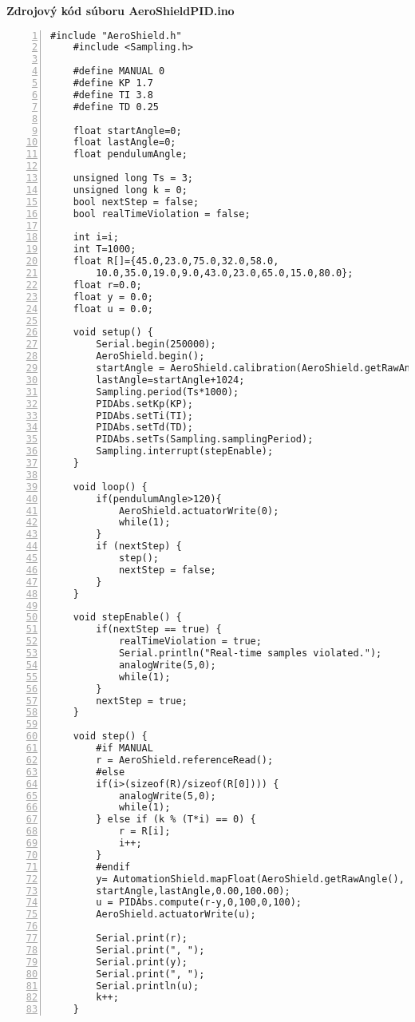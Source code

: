 \LARGE\bf{Zdrojový kód súboru AeroShieldPID.ino}
\label{AeroShieldPID.ino}
\vspace{1cm}
\begin{lstlisting}[numbers=left,basicstyle=\scriptsize,caption={Zdrojový kód súboru AeroShieldPID.ino.},captionpos=b]	
	#include "AeroShield.h"              
	#include <Sampling.h>   
	
	#define MANUAL 0    
	#define KP 1.7  
	#define TI 3.8  
	#define TD 0.25   
	
	float startAngle=0; 
	float lastAngle=0; 
	float pendulumAngle;
	
	unsigned long Ts = 3; 
	unsigned long k = 0; 
	bool nextStep = false;  
	bool realTimeViolation = false;
	
	int i=i;          
	int T=1000;           
	float R[]={45.0,23.0,75.0,32.0,58.0,
		10.0,35.0,19.0,9.0,43.0,23.0,65.0,15.0,80.0}; 
	float r=0.0;          
	float y = 0.0;        
	float u = 0.0;         
	
	void setup() {           
		Serial.begin(250000);                         
		AeroShield.begin();
		startAngle = AeroShield.calibration(AeroShield.getRawAngle()); 
		lastAngle=startAngle+1024;                                  
		Sampling.period(Ts*1000);      
		PIDAbs.setKp(KP);       
		PIDAbs.setTi(TI);    
		PIDAbs.setTd(TD);     
		PIDAbs.setTs(Sampling.samplingPeriod); 
		Sampling.interrupt(stepEnable); 
	}
	
	void loop() {
		if(pendulumAngle>120){
			AeroShield.actuatorWrite(0);
			while(1);
		} 
		if (nextStep) {    
			step();          
			nextStep = false;  
		}
	}
	
	void stepEnable() {             
		if(nextStep == true) {         
			realTimeViolation = true;   
			Serial.println("Real-time samples violated."); 
			analogWrite(5,0);  
			while(1);    
		}
		nextStep = true; 
	}
	
	void step() {  
		#if MANUAL                       
		r = AeroShield.referenceRead(); 
		#else        
		if(i>(sizeof(R)/sizeof(R[0]))) {  
			analogWrite(5,0); 
			while(1); 
		} else if (k % (T*i) == 0) {
			r = R[i];
			i++; 
		}
		#endif
		y= AutomationShield.mapFloat(AeroShield.getRawAngle(),
		startAngle,lastAngle,0.00,100.00);
		u = PIDAbs.compute(r-y,0,100,0,100);
		AeroShield.actuatorWrite(u);
		
		Serial.print(r);
		Serial.print(", ");
		Serial.print(y); 
		Serial.print(", ");
		Serial.println(u); 
		k++; 
	}
\end{lstlisting}